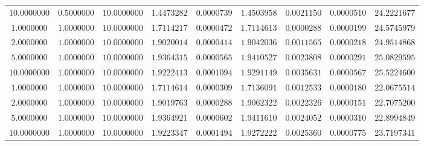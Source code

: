\begin{tabular}{ccccccccc}
$10.0000000$ & $0.5000000$ & $10.0000000$ & $1.4473282$ & $0.0000739$ & $1.4503958$ & $0.0021150$ & $0.0000510$ & $24.2221677$\\
$1.0000000$ & $1.0000000$ & $10.0000000$ & $1.7114217$ & $0.0000472$ & $1.7114613$ & $0.0000288$ & $0.0000199$ & $24.5745979$\\
$2.0000000$ & $1.0000000$ & $10.0000000$ & $1.9020014$ & $0.0000414$ & $1.9042036$ & $0.0011565$ & $0.0000218$ & $24.9514868$\\
$5.0000000$ & $1.0000000$ & $10.0000000$ & $1.9364315$ & $0.0000565$ & $1.9410527$ & $0.0023808$ & $0.0000291$ & $25.0829595$\\
$10.0000000$ & $1.0000000$ & $10.0000000$ & $1.9222413$ & $0.0001094$ & $1.9291149$ & $0.0035631$ & $0.0000567$ & $25.5224600$\\
$1.0000000$ & $1.0000000$ & $10.0000000$ & $1.7114614$ & $0.0000309$ & $1.7136091$ & $0.0012533$ & $0.0000180$ & $22.0675514$\\
$2.0000000$ & $1.0000000$ & $10.0000000$ & $1.9019763$ & $0.0000288$ & $1.9062322$ & $0.0022326$ & $0.0000151$ & $22.7075200$\\
$5.0000000$ & $1.0000000$ & $10.0000000$ & $1.9364921$ & $0.0000602$ & $1.9411610$ & $0.0024052$ & $0.0000310$ & $22.8994849$\\
$10.0000000$ & $1.0000000$ & $10.0000000$ & $1.9223347$ & $0.0001494$ & $1.9272222$ & $0.0025360$ & $0.0000775$ & $23.7197341$\\
\end{tabular}
